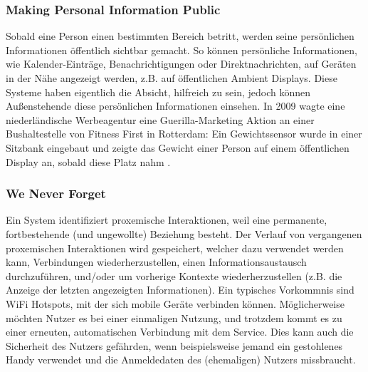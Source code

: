 \documentclass[a4paper]{article}
\begin{document}
\subsubsection{Making Personal Information Public}
Sobald eine Person einen bestimmten Bereich betritt, werden seine persönlichen Informationen öffentlich sichtbar gemacht. So können persönliche Informationen, wie Kalender-Einträge, Benachrichtigungen oder Direktnachrichten, auf Geräten in der Nähe angezeigt werden, z.B. auf öffentlichen \glqq Ambient Displays\grqq{}. Diese Systeme haben eigentlich die Absicht, hilfreich zu sein, jedoch können Außenstehende diese persönlichen Informationen einsehen.\newline
In 2009 wagte eine niederländische Werbeagentur eine Guerilla-Marketing Aktion an einer Bushaltestelle von Fitness First in Rotterdam: Ein Gewichtssensor wurde in einer Sitzbank eingebaut und zeigte das Gewicht einer Person auf einem öffentlichen Display an, sobald diese Platz nahm \cite{fitness_first}.

\subsubsection{We Never Forget}
Ein System identifiziert proxemische Interaktionen, weil eine permanente, fortbestehende (und ungewollte) Beziehung besteht. Der Verlauf von vergangenen proxemischen Interaktionen wird gespeichert, welcher dazu verwendet werden kann, Verbindungen wiederherzustellen, einen Informationsaustausch durchzuführen, und/oder um vorherige Kontexte wiederherzustellen (z.B. die Anzeige der letzten angezeigten Informationen).\newline
Ein typisches Vorkommnis sind WiFi Hotspots, mit der sich mobile Geräte verbinden können. Möglicherweise möchten Nutzer es bei einer einmaligen Nutzung, und trotzdem kommt es zu einer erneuten, automatischen Verbindung mit dem Service. Dies kann auch die Sicherheit des Nutzers gefährden, wenn beispielsweise jemand ein gestohlenes Handy verwendet und die Anmeldedaten des (ehemaligen) Nutzers missbraucht.
\end{document}
